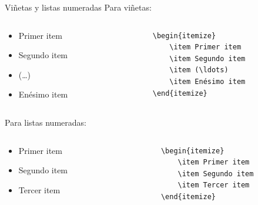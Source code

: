 \documentclass[compress,svgnames]{beamer}
\begin{document}
\begin{frame}[fragile]{Viñetas y listas numeradas}
Para viñetas:
\begin{columns}
	\begin{column}{0.5\textwidth}
		\begin{itemize}
			\item Primer item
			\item Segundo item
			\item (\ldots)
			\item Enésimo item
		\end{itemize}
	\end{column}
	\begin{column}{0.5\textwidth}  
\begin{lstlisting}
	\begin{itemize}
		\item Primer item
		\item Segundo item
		\item (\ldots)
		\item Enésimo item
	\end{itemize}
\end{lstlisting}
	\end{column}
\end{columns}
Para listas numeradas:
\begin{columns}
	\begin{column}{0.5\textwidth}
		\begin{itemize}
			\item Primer item
			\item Segundo item
			\item Tercer item
		\end{itemize}
	\end{column}
	\begin{column}{0.5\textwidth} 
	\begin{lstlisting}
		\begin{itemize}
			\item Primer item
			\item Segundo item
			\item Tercer item
		\end{itemize}
	\end{lstlisting}
	\end{column}
\end{columns}
\end{frame}
\end{document}
